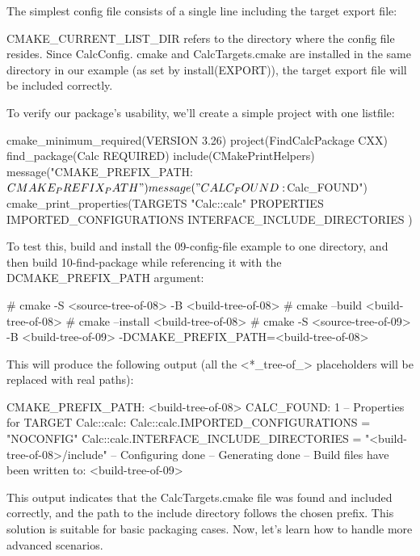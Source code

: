 The simplest config file consists of a single line including the target export file:



CMAKE\_CURRENT\_LIST\_DIR refers to the directory where the config file resides. Since CalcConfig. cmake and CalcTargets.cmake are installed in the same directory in our example (as set by install(EXPORT)), the target export file will be included correctly.

To verify our package’s usability, we’ll create a simple project with one listfile:


\begin{cmake}
cmake_minimum_required(VERSION 3.26)
project(FindCalcPackage CXX)
find_package(Calc REQUIRED)
include(CMakePrintHelpers)
message("CMAKE_PREFIX_PATH: ${CMAKE_PREFIX_PATH}")
message("CALC_FOUND: ${Calc_FOUND}")
cmake_print_properties(TARGETS "Calc::calc" PROPERTIES
    IMPORTED_CONFIGURATIONS
    INTERFACE_INCLUDE_DIRECTORIES
)
\end{cmake}

To test this, build and install the 09-config-file example to one directory, and then build 10-find-package while referencing it with the DCMAKE\_PREFIX\_PATH argument:

\begin{shell}
# cmake -S <source-tree-of-08> -B <build-tree-of-08>
# cmake --build <build-tree-of-08>
# cmake --install <build-tree-of-08>
# cmake -S <source-tree-of-09> -B <build-tree-of-09>
        -DCMAKE_PREFIX_PATH=<build-tree-of-08>
\end{shell}

This will produce the following output (all the <*\_tree-of\_> placeholders will be replaced with real paths):

\begin{shell}
CMAKE_PREFIX_PATH: <build-tree-of-08>
CALC_FOUND: 1
--
Properties for TARGET Calc::calc:
   Calc::calc.IMPORTED_CONFIGURATIONS = "NOCONFIG"
   Calc::calc.INTERFACE_INCLUDE_DIRECTORIES = "<build-tree-of-08>/include"
-- Configuring done
-- Generating done
-- Build files have been written to: <build-tree-of-09>
\end{shell}

This output indicates that the CalcTargets.cmake file was found and included correctly, and the path to the include directory follows the chosen prefix. This solution is suitable for basic packaging cases. Now, let’s learn how to handle more advanced scenarios.

